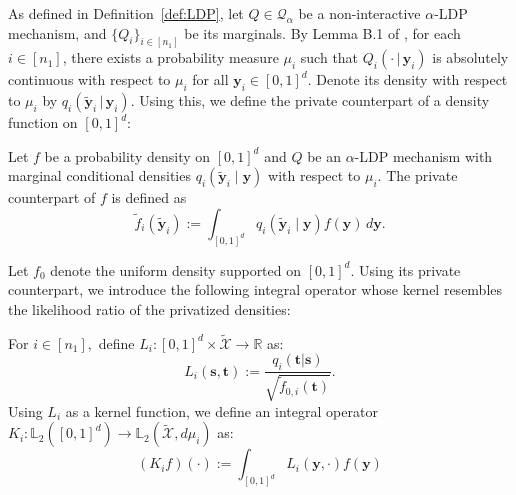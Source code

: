 \documentclass[twoside,11pt]{article}
\newcommand{\Ell}{\mathbb{L}}
\newcommand{\EllTwo}{\Ell_2} %
\newcommand{\sampleSizeOne}{\sampleSize_1}
\newcommand{\vectorize}[1]{\mathbf{#1}}
\newcommand{\private}[1]{\tilde{#1}}
\newcommand{\rvX}{X} %
\newcommand{\rvXCodomain}{\mathcal{\rvX}} %
\newcommand{\rvXPrivCodomain}{\tilde{\rvXCodomain}}
\newcommand{\sampleIndexOne}{i}
\newcommand{\dimDensity}{d} %
\newcommand{\sampleSize}{n}
\newcommand{\privacyDensity}{q}
\newcommand{\kernelOperator}{L}
\newcommand{\privacyMechanism}{Q}
\newcommand{\privacyParameter}{\alpha} %
\newcommand{\domainTs}{
	[0,1]^{{\dimDensity}}
}
\begin{document}
\begin{appendix}
	As defined in Definition~\ref{def:LDP},
	let $\privacyMechanism \in \mathcal{\privacyMechanism}_\privacyParameter$ be a non-interactive $\privacyParameter$-LDP mechanism, and
	$
	\{\privacyMechanism_\sampleIndexOne\}_{
		\sampleIndexOne \in [\sampleSizeOne]
	}$ be its marginals.
	By Lemma B.1 of \citet{Lam-Weil2021MinimaxConstraint}, for each $i \in [n_1]$, there exists a probability measure $\mu_i$ such that  $\privacyMechanism_i(\cdot \,|\, \vectorize{y}_i)$ is absolutely continuous with respect to $\mu_i$ for all $\vectorize{y}_i \in [0,1]^d$. Denote its density with respect to $\mu_i$ by $\privacyDensity_i(\tilde{\vectorize{y}}_i \,|\, \vectorize{y}_i)$.
	Using this, we define the private counterpart of a density function on $[0,1]^d$:
	\begin{definition}\label{def:private_density}
		Let \( f \) be a probability density on \( [0,1]^d \) and $Q$ be an $\privacyParameter$-LDP mechanism with marginal conditional  densities \( q_i(\tilde{\vectorize{y}}_i \mid \vectorize{y}) \) with respect to  \( \mu_i \). The private counterpart of \( f \) is defined as
		\[
		\tilde{f}_i(\tilde{\vectorize{y}}_i) := \int_{[0,1]^d} q_i(\tilde{\vectorize{y}}_i \mid \vectorize{y}) f(\vectorize{y}) \, d\vectorize{y}.
		\]
	\end{definition}
	Let \( f_0 \) denote the uniform density supported on \( \domainTs \). Using its private counterpart, we introduce the following integral operator whose kernel resembles the likelihood ratio of the privatized densities:
	\begin{definition}\label{integral_operator}
		For  $\sampleIndexOne \in [\sampleSize_1],$
		define $\kernelOperator_\sampleIndexOne:
		[0,1]^\dimDensity
		\times
		\rvXPrivCodomain
		\to \mathbb{R}$ as:
		\begin{equation*}
			\kernelOperator_\sampleIndexOne(
			\vectorize{s},
			\vectorize{t}
			)
			:= 
			\frac{
				\privacyDensity_\sampleIndexOne(
				\vectorize{t} |\vectorize{s})
			}{
				\sqrt{
					\private{f}_{0,\sampleIndexOne}(\vectorize{t})
				}
			}.
		\end{equation*}
		Using $L_i$ as a kernel function, we define an integral operator $K_i:
		\EllTwo([0,1]^\dimDensity)
		\to
		\EllTwo(\rvXPrivCodomain, d\mu_i)
		$ 
		as:
		\begin{equation*}
			(K_\sampleIndexOne f)(\cdot) :=
			\int_{[0,1]^\dimDensity} 
			\kernelOperator_\sampleIndexOne
			( \vectorize{y}, \cdot)
			f(\vectorize{y})

\end{equation*}
\end{definition}
\end{appendix}
\end{document}
